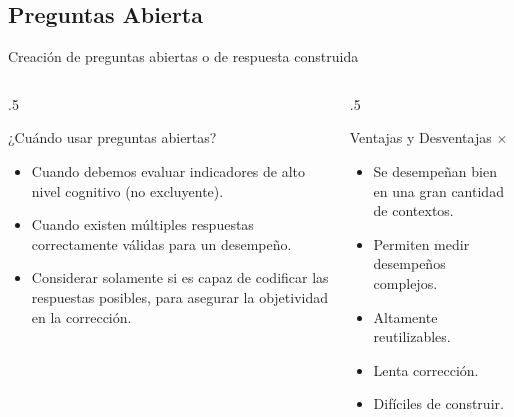 \documentclass[11pt, aspectratio=169, xcolor=table,hyphens]{beamer}
\begin{document}
\subsection{Preguntas  Abierta}
\begin{frame}{Creación de preguntas abiertas o de respuesta construida}
	\begin{columns}
		\begin{column}{.5\linewidth}
			\begin{block}{¿Cuándo usar preguntas abiertas?}
				\begin{itemize}
					\justifying
					\item Cuando debemos evaluar indicadores de alto nivel cognitivo (no excluyente).
					\item Cuando existen múltiples respuestas correctamente válidas para un desempeño.
					\item Considerar solamente si es capaz de codificar las respuestas posibles, para asegurar la objetividad en la corrección.
				\end{itemize}
			\end{block}
		\end{column}
		\begin{column}{.5\linewidth}
			\begin{block}{Ventajas \checkmark y Desventajas $\times$}
				\begin{itemize}
					\item[\checkmark] Se desempeñan bien en una gran cantidad de contextos.
					\item[\checkmark] Permiten medir desempeños complejos.
					\item[\checkmark] Altamente reutilizables.
					\item[$\times$] Lenta corrección.
					\item[$\times$] Difíciles de construir.
				\end{itemize}
			\end{block}
		\end{column}
	\end{columns}
\end{frame}
\end{document}
